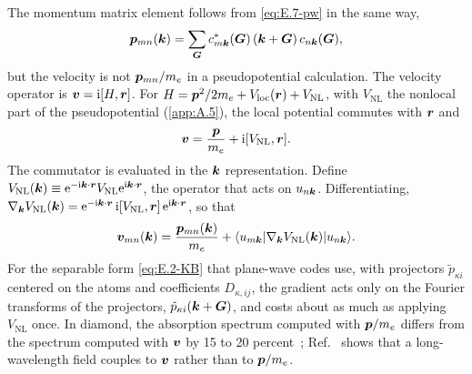 The momentum matrix element follows from \cref{eq:E.7-pw} in the same way,
\begin{equation}
  \bm{p}_{mn}(\bm{k}) = \sum_{\bm{G}} c^*_{m\bm{k}}(\bm{G})\,(\bm{k} + \bm{G})\,c_{n\bm{k}}(\bm{G}) ,
  \label{eq:E.7-ppw}
\end{equation}
but the velocity is not $\bm{p}_{mn}/m_e$ in a pseudopotential calculation. The velocity operator is $\bm{v} = \mathrm{i}[H,\bm{r}]$. For $H = \bm{p}^2/2m_e + V_{\mathrm{loc}}(\bm{r}) + V_{\mathrm{NL}}$, with $V_{\mathrm{NL}}$ the nonlocal part of the pseudopotential (\cref{app:A.5}), the local potential commutes with $\bm{r}$ and
\begin{equation}
  \bm{v} = \frac{\bm{p}}{m_e} + \mathrm{i}[V_{\mathrm{NL}},\bm{r}] .
  \label{eq:E.7-v}
\end{equation}
The commutator is evaluated in the $\bm{k}$ representation. Define $V_{\mathrm{NL}}(\bm{k}) \equiv \mathrm{e}^{-\mathrm{i}\bm{k}\cdot\bm{r}}V_{\mathrm{NL}}\mathrm{e}^{\mathrm{i}\bm{k}\cdot\bm{r}}$, the operator that acts on $u_{n\bm{k}}$. Differentiating, $\nabla_{\bm{k}}V_{\mathrm{NL}}(\bm{k}) = \mathrm{e}^{-\mathrm{i}\bm{k}\cdot\bm{r}}\,\mathrm{i}[V_{\mathrm{NL}},\bm{r}]\,\mathrm{e}^{\mathrm{i}\bm{k}\cdot\bm{r}}$, so that
\begin{equation}
  \bm{v}_{mn}(\bm{k}) = \frac{\bm{p}_{mn}(\bm{k})}{m_e} + \langle u_{m\bm{k}}|\nabla_{\bm{k}}V_{\mathrm{NL}}(\bm{k})|u_{n\bm{k}}\rangle .
  \label{eq:E.7-vNL}
\end{equation}
For the separable form \cref{eq:E.2-KB} that plane-wave codes use, with projectors $\tilde p_{\kappa i}$ centered on the atoms and coefficients $D_{\kappa,ij}$, the gradient acts only on the Fourier transforms of the projectors, $\tilde p_{\kappa i}(\bm{k}+\bm{G})$, and costs about as much as applying $V_{\mathrm{NL}}$ once. In diamond, the absorption spectrum computed with $\bm{p}/m_e$ differs from the spectrum computed with $\bm{v}$ by 15 to 20 percent~\cite[Fig.~1]{ismailbeigi2001coupling}; Ref.~\cite[Eq.~(20)]{ismailbeigi2001coupling} shows that a long-wavelength field couples to $\bm{v}$ rather than to $\bm{p}/m_e$.

